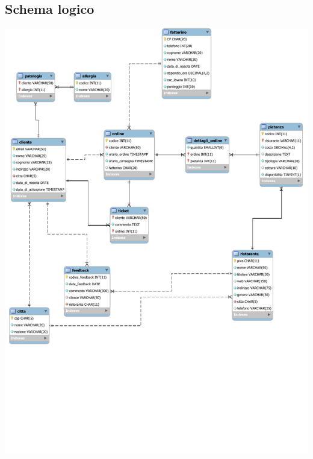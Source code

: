 \documentclass[10pt]{article}
\begin{document}
		\subsection{Schema logico}
			\begin{center}
				\hspace*{-1cm}
				\includegraphics[scale=0.9]{modello_logico.pdf}
				\hspace*{-1cm}
			\end{center}
\end{document}
